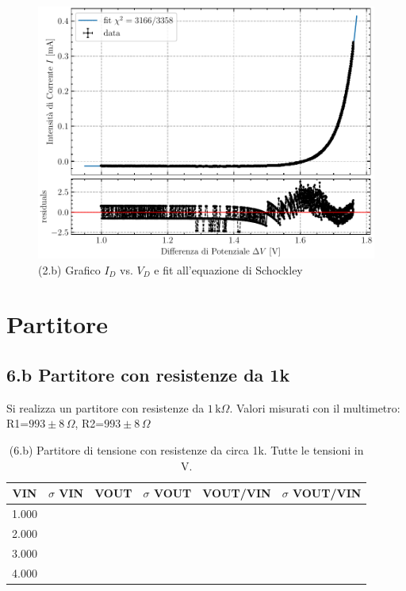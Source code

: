 \documentclass[10pt,a4paper]{article}
\newcommand{\exn}{\phantom{xxx}}
\begin{document}
\begin{figure}[h]
\centering
\includegraphics[scale=0.8]{ivfit}
\caption{(2.b) Grafico $I_{D}$ vs. $V_{D}$ e fit all'equazione di Schockley}
\end{figure}







\section{Partitore}

\subsection*{6.b Partitore con resistenze da 1k}


Si realizza un partitore con resistenze da $1 \,\mathrm{k}\Omega$.
Valori misurati con il multimetro: R1=$993 \pm 8 \,\Omega$,
R2=$993 \pm 8 \,\Omega$


\begin{table}[h]
\centering
\begin{tabular}{|c|c|c|c|c|c|}
\hline 
VIN& $\sigma$ VIN  & VOUT	 & $\sigma$ VOUT & VOUT/VIN & $\sigma$ VOUT/VIN \\
\hline 
1.000 & \exn & \exn & \exn & \exn &\exn \\
2.000 & \exn & \exn & \exn & \exn &\exn \\
3.000 & \exn & \exn & \exn & \exn &\exn \\
4.000 & \exn & \exn & \exn & \exn &\exn \\
\hline 
\end{tabular} 
\caption{(6.b) Partitore di tensione con resistenze da circa 1k. Tutte le
tensioni in V.\label{t:par1}}
\end{table}
\end{document}
